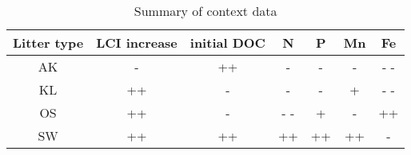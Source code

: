 \newpage
\begin{table*}[p] 
\begin{tabular}{ccccccc}
Litter type & LCI increase & initial DOC & N & P & Mn & Fe \\
\hline
AK&-&++&-\-&-&-\-&- -\\
KL&++&-\-&-&-\-&+&- -\\
OS&++&-\-&- -&+&-&++\\
SW&++&++&++&++&++&-\-\\
\hline
\end{tabular}
\caption{Summary of context data}
\label{tab:summary}
\end{table*}
